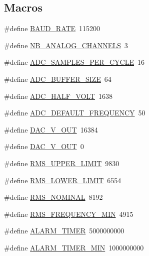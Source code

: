 \subsection*{Macros}
\begin{DoxyCompactItemize}
\item 
\#define \hyperlink{group__main__module_gad4455691936f92fdd6c37566fc58ba1f}{B\+A\+U\+D\+\_\+\+R\+A\+T\+E}~115200
\item 
\#define \hyperlink{group__main__module_ga300da08cc989dc0963caf3a5afc024b8}{N\+B\+\_\+\+A\+N\+A\+L\+O\+G\+\_\+\+C\+H\+A\+N\+N\+E\+L\+S}~3
\item 
\#define \hyperlink{group__main__module_ga8147862142d26bcb84181f1cb13fe9ca}{A\+D\+C\+\_\+\+S\+A\+M\+P\+L\+E\+S\+\_\+\+P\+E\+R\+\_\+\+C\+Y\+C\+L\+E}~16
\item 
\#define \hyperlink{group__main__module_ga602abb8ec84dcb3b6f854a738310ea46}{A\+D\+C\+\_\+\+B\+U\+F\+F\+E\+R\+\_\+\+S\+I\+Z\+E}~64
\item 
\#define \hyperlink{group__main__module_gafe78c43ff273ddaa018e3736e2432b6e}{A\+D\+C\+\_\+\+H\+A\+L\+F\+\_\+\+V\+O\+L\+T}~1638
\item 
\#define \hyperlink{group__main__module_gaa067e472772e40193263669629a22457}{A\+D\+C\+\_\+\+D\+E\+F\+A\+U\+L\+T\+\_\+\+F\+R\+E\+Q\+U\+E\+N\+C\+Y}~50
\item 
\#define \hyperlink{group__main__module_gab110f154b64270bb14d8054beb1fb53d}{D\+A\+C\+\_\+V\+\_\+\+O\+U\+T}~16384
\item 
\#define \hyperlink{group__main__module_ga03a9b512de08ae21d6c80e8a3a7c2444}{D\+A\+C\+\_\+V\+\_\+\+O\+U\+T}~0
\item 
\#define \hyperlink{group__main__module_ga6469928cdd99c8ad63925324d6d22046}{R\+M\+S\+\_\+\+U\+P\+P\+E\+R\+\_\+\+L\+I\+M\+I\+T}~9830
\item 
\#define \hyperlink{group__main__module_gaec1772e4e8dfe00517b49a1ffadc334c}{R\+M\+S\+\_\+\+L\+O\+W\+E\+R\+\_\+\+L\+I\+M\+I\+T}~6554
\item 
\#define \hyperlink{group__main__module_gacb4e22d5767a0e19f846af81a2067fc1}{R\+M\+S\+\_\+\+N\+O\+M\+I\+N\+A\+L}~8192
\item 
\#define \hyperlink{group__main__module_gaafbbd0f2b6eece3d2d34fe20b568a235}{R\+M\+S\+\_\+\+F\+R\+E\+Q\+U\+E\+N\+C\+Y\+\_\+\+M\+I\+N}~4915
\item 
\#define \hyperlink{group__main__module_ga833078dd8dd1c024d2aff22110d1893f}{A\+L\+A\+R\+M\+\_\+\+T\+I\+M\+E\+R}~5000000000
\item 
\#define \hyperlink{group__main__module_ga00ebf8f64952fc957be8395c2ec991b9}{A\+L\+A\+R\+M\+\_\+\+T\+I\+M\+E\+R\+\_\+\+M\+I\+N}~1000000000
\end{DoxyCompactItemize}
